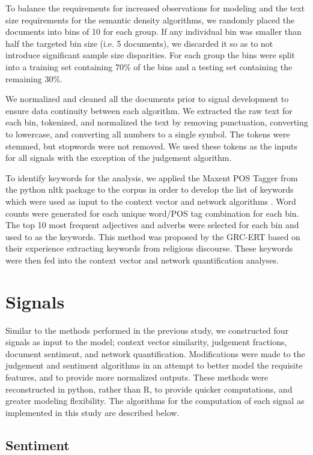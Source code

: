 \documentclass[11pt]{article}
\begin{document}
To balance the requirements for increased observations for modeling and the text size requirements for the semantic density algorithms, we randomly placed the documents into bins of 10 for each group. If any individual bin was smaller than half the targeted bin size (i.e. 5 documents), we discarded it so as to not introduce significant sample size disparities. For each group the bins were split into a training set containing 70\% of the bins and a testing set containing the remaining 30\%. 

We normalized and cleaned all the documents prior to signal development to ensure data continuity between each algorithm. We extracted the raw text for each bin, tokenized,  and normalized the text by removing punctuation, converting to lowercase, and converting all numbers to a single symbol. The tokens were stemmed, but stopwords were not removed. We used these tokens as the inputs for all signals with the exception of the judgement algorithm.

To identify keywords for the analysis, we applied the Maxent POS Tagger from the python nltk package  to the corpus in order to develop the list of keywords which were used as input to the context vector and network algorithms \cite{NLTK}. Word counts were generated for each unique word/POS tag combination for each bin. The top 10 most frequent adjectives and adverbs were selected for each bin and used to as the keywords. This method was proposed by the GRC-ERT based on their experience extracting keywords from religious discourse. These keywords were then fed into the context vector and network quantification analyses. 

\section{Signals}

Similar to the methods performed in the previous study, we constructed four signals as input to the model; context vector similarity, judgement fractions, document sentiment, and network quantification. Modifications were made to the judgement and sentiment algorithms in an attempt to better model the requisite features, and to provide more normalized outputs. These methods were reconstructed in python, rather than R, to provide quicker computations, and greater modeling flexibility. The algorithms for the computation of each signal as implemented in this study are described below.

\subsection{Sentiment}
\end{document}
